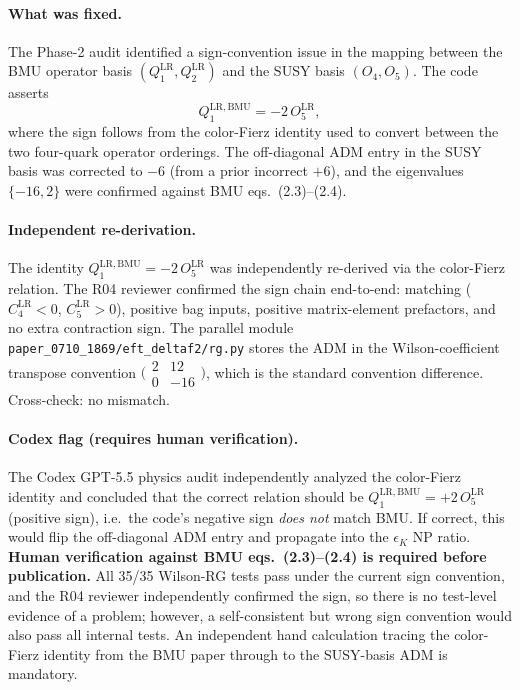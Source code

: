 \documentclass[11pt]{article}
\newcommand{\eK}{\epsilon_K}
\begin{document}
\paragraph{What was fixed.}
The Phase-2 audit identified a sign-convention issue in the mapping
between the BMU operator basis $(Q_1^{\mathrm{LR}},
Q_2^{\mathrm{LR}})$ and the SUSY basis $(O_4, O_5)$.  The code
asserts
\begin{equation}\label{eq:q1lr-map}
  Q_1^{\mathrm{LR,BMU}} = -2\,O_5^{\mathrm{LR}},
\end{equation}
where the sign follows from the color-Fierz identity used to convert
between the two four-quark operator orderings.  The off-diagonal ADM
entry in the SUSY basis was corrected to $-6$ (from a prior incorrect
$+6$), and the eigenvalues $\{-16, 2\}$ were confirmed against BMU
eqs.~(2.3)--(2.4).

\paragraph{Independent re-derivation.}
The identity $Q_1^{\mathrm{LR,BMU}} = -2\,O_5^{\mathrm{LR}}$ was
independently re-derived via the color-Fierz relation.  The R04
reviewer confirmed the sign chain end-to-end: matching
($C_4^{\mathrm{LR}} < 0$, $C_5^{\mathrm{LR}} > 0$), positive bag
inputs, positive matrix-element prefactors, and no extra contraction
sign.  The parallel module
\texttt{paper\_0710\_1869/eft\_deltaf2/rg.py} stores the ADM in the
Wilson-coefficient transpose convention
$\bigl(\begin{smallmatrix}2&12\\0&-16\end{smallmatrix}\bigr)$, which
is the standard convention difference.  Cross-check: no mismatch.

\paragraph{Codex flag (\textbf{requires human verification}).}
The Codex GPT-5.5 physics audit independently analyzed the
color-Fierz identity and concluded that the correct relation
should be $Q_1^{\mathrm{LR,BMU}} = +2\,O_5^{\mathrm{LR}}$ (positive
sign), i.e.\ the code's negative sign \emph{does not} match BMU.
If correct, this would flip the off-diagonal ADM entry and propagate
into the $\eK$ NP ratio.  \textbf{Human verification against BMU
eqs.~(2.3)--(2.4) is required before publication.}  All 35/35
Wilson-RG tests pass under the current sign convention, and the R04
reviewer independently confirmed the sign, so there is no test-level
evidence of a problem; however, a self-consistent but wrong sign
convention would also pass all internal tests.  An independent hand
calculation tracing the color-Fierz identity from the BMU paper
through to the SUSY-basis ADM is mandatory.
\end{document}
